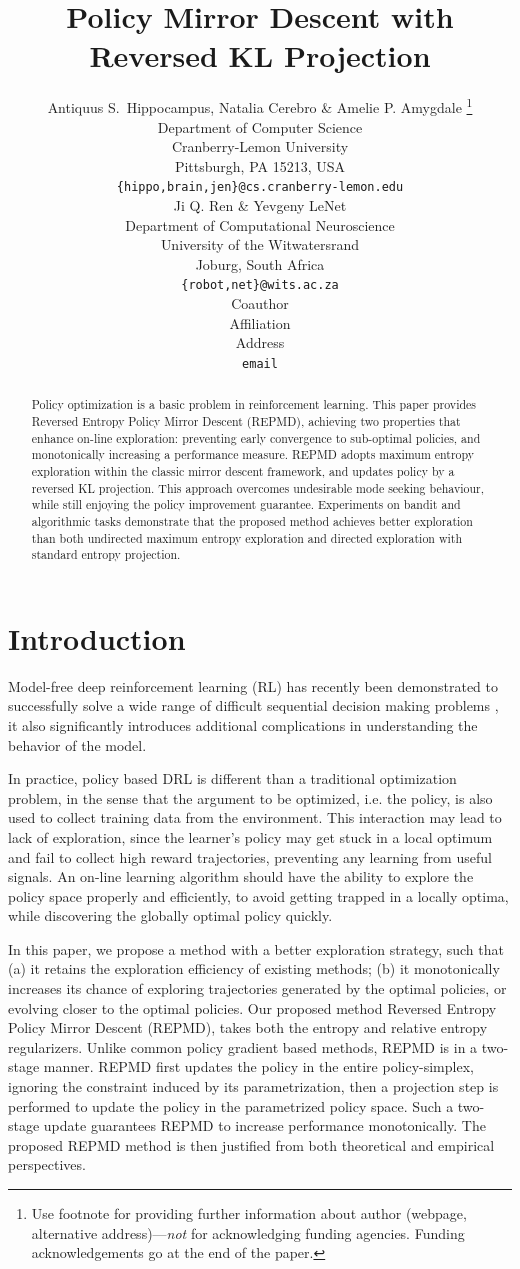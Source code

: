 \documentclass{article} %
\title{Policy Mirror Descent with Reversed KL Projection}
\author{Antiquus S.~Hippocampus, Natalia Cerebro \& Amelie P. Amygdale \thanks{ Use footnote for providing further information
about author (webpage, alternative address)---\emph{not} for acknowledging
funding agencies.  Funding acknowledgements go at the end of the paper.} \\
Department of Computer Science\\
Cranberry-Lemon University\\
Pittsburgh, PA 15213, USA \\
\texttt{\{hippo,brain,jen\}@cs.cranberry-lemon.edu} \\
\And
Ji Q. Ren \& Yevgeny LeNet \\
Department of Computational Neuroscience \\
University of the Witwatersrand \\
Joburg, South Africa \\
\texttt{\{robot,net\}@wits.ac.za} \\
\AND
Coauthor \\
Affiliation \\
Address \\
\texttt{email}
}
\begin{document}
\maketitle

\begin{abstract}
Policy optimization is a basic problem in reinforcement learning. This paper provides Reversed Entropy Policy Mirror Descent (REPMD), achieving two properties that enhance on-line exploration: preventing early convergence to  sub-optimal policies, and monotonically increasing a performance measure. REPMD adopts maximum entropy exploration within the classic mirror descent framework, and updates policy by a reversed KL projection. This approach overcomes undesirable mode seeking behaviour, while still enjoying the policy improvement guarantee. Experiments on bandit and algorithmic tasks demonstrate that the proposed method achieves better exploration than both undirected maximum entropy exploration and directed exploration with standard entropy projection.
\end{abstract}

\section{Introduction}
Model-free deep reinforcement learning (RL) has recently been demonstrated to successfully solve a wide range of difficult sequential decision making problems \citep{schulman2015trust,mnih2015human,silver2016mastering}, it also significantly introduces additional complications in understanding the behavior of the model. 

In practice, policy based DRL is different than a traditional optimization problem, in the sense that the argument to be optimized, i.e. the policy, is also used to collect training data from the environment. This interaction may lead to lack of exploration, since the learner's policy may get stuck in a local optimum and fail to collect high reward trajectories, preventing any learning from useful signals.  An on-line learning algorithm should have the ability to explore the policy space properly and efficiently, to avoid getting trapped in a locally optima, while discovering the globally optimal policy quickly.

In this paper, we propose a method with a better exploration strategy, such that (a) it retains the exploration efficiency of existing methods; (b) it monotonically increases its chance of exploring trajectories generated by the optimal policies, or evolving closer to the optimal policies. Our proposed method Reversed Entropy Policy Mirror Descent (REPMD), takes both the entropy and relative entropy regularizers. Unlike common policy gradient based methods, REPMD is in a two-stage manner.  REPMD first updates the policy in the entire policy-simplex, ignoring the constraint induced by its parametrization, then a projection step is performed to update the policy in the parametrized policy space. Such a two-stage update guarantees REPMD to increase performance monotonically. The proposed REPMD method is then justified from both theoretical and empirical perspectives.
\end{document}
